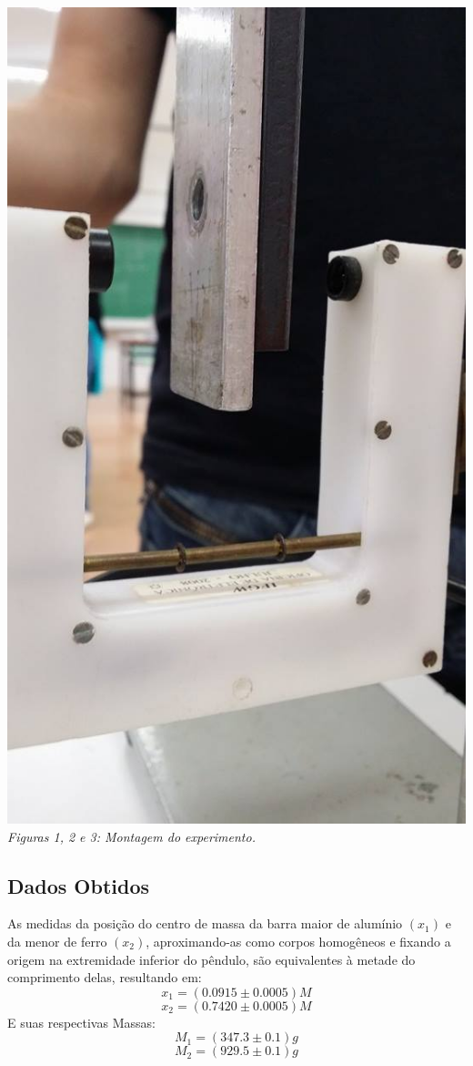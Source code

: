 \documentclass[12pt,a4paper]{article}
\begin{document}
\includegraphics[scale=0.30]{3.jpg} 
\emph{Figuras 1, 2 e 3: Montagem do experimento.}




\subsection{Dados Obtidos}

As medidas da posição do centro de massa da barra maior de alumínio $(x_1)$ e da menor de ferro $(x_2)$, aproximando-as como corpos homogêneos e fixando a origem na extremidade inferior do pêndulo, são equivalentes à metade do comprimento delas, resultando em: \\
$$ x_1 = (0.0915 \pm 0.0005) M$$
$$ x_2 = (0.7420 \pm 0.0005) M$$
E suas respectivas Massas:\\
$$ M_1 = (347.3 \pm 0.1) g $$
$$ M_2 = (929.5 \pm 0.1) g $$
\end{document}
